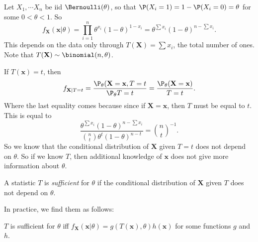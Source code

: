 \documentclass[a4paper]{article}
\begin{document}
\begin{eg}
  Let $X_1, \cdots X_n$ be iid $\Bernoulli(\theta)$, so that $\P(X_i = 1) = 1 - \P(X_i = 0) = \theta$ for some $0 < \theta < 1$. So
  \[
    f_{\mathbf{X}} (\mathbf{x}|\theta) = \prod_{i = 1}^n \theta^{x_i}(1 - \theta)^{1 - x_i} = \theta^{\sum x_i}(1 - \theta)^{n - \sum x_i}.
  \]
  This depends on the data only through $T(\mathbf{X}) = \sum x_i$, the total number of ones. Note that $T(\mathbf{X})\sim \binomial(n, \theta)$.

  If $T(\mathbf{x}) = t$, then
  \[
    f_{\mathbf{X}|T = t} = \frac{\P_\theta(\mathbf{X} = \mathbf{x}, T = t}{\P_\theta T = t} = \frac{\P_\theta(\mathbf{X} = \mathbf{x})}{T = t}.
  \]
  Where the last equality comes because since if $\mathbf{X} = \mathbf{x}$, then $T$ must be equal to $t$. This is equal to
  \[
    \frac{\theta^{\sum x_i}(1 - \theta)^{n - \sum x_i}}{\binom{n}{t}\theta^t (1 - \theta)^{n - t}} = \binom{n}{t}^{-1}.
  \]
  So we know that the conditional distribution of $\mathbf{X}$ given $T = t$ does not depend on $\theta$. So if we know $T$, then additional knowledge of $\mathbf{x}$ does not give more information about $\theta$.
\end{eg}

\begin{defi}
  A statistic $T$ is \emph{sufficient} for $\theta$ if the conditional distribution of $\mathbf{X}$ given $T$ does not depend on $\theta$.
\end{defi}

In practice, we find them as follows:
\begin{thm}
  $T$ is sufficient for $\theta$ iff $f_{\mathbf{X}}(\mathbf{x} |\theta) = g(T(\mathbf{x}), \theta)h(\mathbf{x})$ for some functions $g$ and $h$.
\end{thm}
\end{document}
